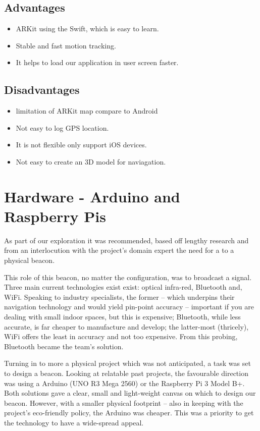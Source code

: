 \subsection{Advantages}
\begin{itemize}
    \item ARKit using the Swift, which is easy to learn.
    \item Stable and fast motion tracking.
    \item It helps to load our application in user screen faster.
\end{itemize}

\subsection{Disadvantages}
\begin{itemize}
    \item limitation of ARKit map compare to Android
    \item Not easy to log GPS location.
    \item It is not flexible only support iOS devices.
    \item Not easy to create an 3D model for naviagation.
\end{itemize}

\section{Hardware - Arduino and Raspberry Pis}
As part of our exploration it was recommended, based off lengthy research and from an interlocution with the project’s domain expert the need for a to a physical beacon. 

This role of this beacon, no matter the configuration, was to broadcast a signal. Three main current technologies exist exist: optical infra-red, Bluetooth and, WiFi. Speaking to industry specialists, the former – which underpins their navigation technology and would yield pin-point accuracy – important if you are dealing with small indoor spaces, but this is expensive; Bluetooth, while less accurate, is far cheaper to manufacture and develop; the latter-most (thricely), WiFi offers the least in accuracy and not too expensive. From this probing, Bluetooth became the team’s solution.

Turning in to more a physical project which was not anticipated, a task was set to design a beacon. Looking at relatable past projects, the favourable direction was using a Arduino (UNO R3 Mega 2560) or the Raspberry Pi 3 Model B+. Both solutions gave a clear, small and light-weight canvas on which to design our beacon. However, with a smaller physical footprint – also in keeping with the project’s eco-friendly policy, the Arduino was cheaper. This was a priority to get the technology to have a wide-spread appeal. 

